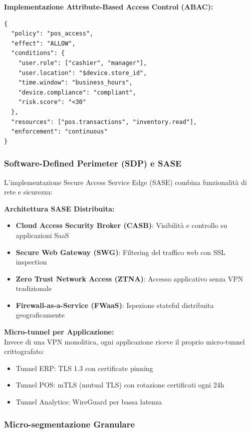 \textbf{Implementazione Attribute-Based Access Control (ABAC):}
\begin{lstlisting}[caption={Policy ABAC per accesso POS},label={lst:abac_policy}]
{
  "policy": "pos_access",
  "effect": "ALLOW",
  "conditions": {
    "user.role": ["cashier", "manager"],
    "user.location": "$device.store_id",
    "time.window": "business_hours",
    "device.compliance": "compliant",
    "risk.score": "<30"
  },
  "resources": ["pos.transactions", "inventory.read"],
  "enforcement": "continuous"
}
\end{lstlisting}

\subsubsection{\texorpdfstring{\textbf{Software-Defined Perimeter (SDP) e SASE}}{3.5.1.2 - Software-Defined Perimeter (SDP) e SASE}}

L'implementazione Secure Access Service Edge (SASE) combina funzionalità di rete e sicurezza:

\textbf{Architettura SASE Distribuita:}
\begin{itemize}
    \item \textbf{Cloud Access Security Broker (CASB)}: Visibilità e controllo su applicazioni SaaS
    \item \textbf{Secure Web Gateway (SWG)}: Filtering del traffico web con SSL inspection
    \item \textbf{Zero Trust Network Access (ZTNA)}: Accesso applicativo senza VPN tradizionale
    \item \textbf{Firewall-as-a-Service (FWaaS)}: Ispezione stateful distribuita geograficamente
\end{itemize}

\textbf{Micro-tunnel per Applicazione:}\\
Invece di una VPN monolitica, ogni applicazione riceve il proprio micro-tunnel crittografato:
\begin{itemize}
    \item Tunnel ERP: TLS 1.3 con certificate pinning
    \item Tunnel POS: mTLS (mutual TLS) con rotazione certificati ogni 24h
    \item Tunnel Analytics: WireGuard per bassa latenza
\end{itemize}

\subsubsection{\texorpdfstring{\textbf{Micro-segmentazione Granulare}}{3.5.1.3 - Micro-segmentazione Granulare}}

